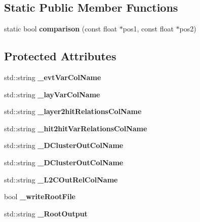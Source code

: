 \subsection*{Static Public Member Functions}
\begin{DoxyCompactItemize}
\item 
static bool {\bfseries comparison} (const float $\ast$pos1, const float $\ast$pos2)\label{classCALICE_1_1ClusterCounter_a6eff0a034511d76aa5dde76768b03698}

\end{DoxyCompactItemize}
\subsection*{Protected Attributes}
\begin{DoxyCompactItemize}
\item 
std\-::string {\bfseries \-\_\-evt\-Var\-Col\-Name}\label{classCALICE_1_1ClusterCounter_a982f03b5d49994d25198f88f6ad0cdab}

\item 
std\-::string {\bfseries \-\_\-lay\-Var\-Col\-Name}\label{classCALICE_1_1ClusterCounter_a0bc5b4e964e43d7db247693efdd2ca66}

\item 
std\-::string {\bfseries \-\_\-layer2hit\-Relations\-Col\-Name}\label{classCALICE_1_1ClusterCounter_a32a906dfc1fc61780f63ff0ee99dcb62}

\item 
std\-::string {\bfseries \-\_\-hit2hit\-Var\-Relations\-Col\-Name}\label{classCALICE_1_1ClusterCounter_a48af01e6e60fad4b4e49b7a32922d5c8}

\item 
std\-::string {\bfseries \-\_\-D\-Cluster\-Out\-Col\-Name}\label{classCALICE_1_1ClusterCounter_ada733e376dc13e11c75d7928b8afa4b4}

\item 
std\-::string {\bfseries \-\_\-D\-Cluster\-Out\-Col\-Name}\label{classCALICE_1_1ClusterCounter_a94e01f495efc808b0b93ab15a3ecce1d}

\item 
std\-::string {\bfseries \-\_\-\-L2\-C\-Out\-Rel\-Col\-Name}\label{classCALICE_1_1ClusterCounter_adac38a6a8d9dd38e9a5b65f4d2f324b4}

\item 
bool {\bfseries \-\_\-write\-Root\-File}\label{classCALICE_1_1ClusterCounter_ac73b4352462fa9c65685758db2fc330d}

\item 
std\-::string {\bfseries \-\_\-\-Root\-Output}\label{classCALICE_1_1ClusterCounter_aaba2acfb9913b2a6a13891c59656053a}


\end{DoxyCompactItemize}
